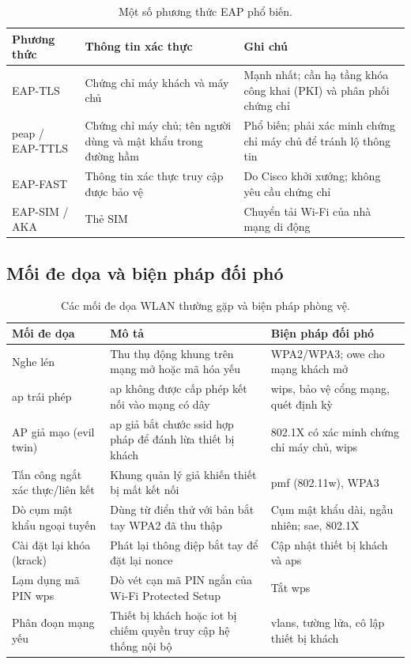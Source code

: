 \begin{table}[htbp]
  \centering\footnotesize
  \caption{Một số phương thức EAP phổ biến.}
  \label{tab:eap}
  \begin{tabularx}{\linewidth}{@{} L{0.6} L{1.2} L{1.2} @{}}
    \toprule
    \textbf{Phương thức} & \textbf{Thông tin xác thực} & \textbf{Ghi chú} \\
    \midrule
    EAP-TLS & Chứng chỉ máy khách và máy chủ & Mạnh nhất; cần hạ tầng khóa công khai (PKI) và phân phối chứng chỉ \\
    \acs{peap} / EAP-TTLS & Chứng chỉ máy chủ; tên người dùng và mật khẩu trong đường hầm & Phổ biến; phải xác minh chứng chỉ máy chủ để tránh lộ thông tin \\
    EAP-FAST & Thông tin xác thực truy cập được bảo vệ & Do Cisco khởi xướng; không yêu cầu chứng chỉ \\
    EAP-SIM / AKA & Thẻ SIM & Chuyển tải Wi-Fi của nhà mạng di động \\
    \bottomrule
  \end{tabularx}
\end{table}

\subsection{Mối đe dọa và biện pháp đối phó}

\begin{table}[!htbp]
  \centering\footnotesize
  \caption{Các mối đe dọa WLAN thường gặp và biện pháp phòng vệ.}
  \label{tab:threats}
  \begin{tabularx}{\linewidth}{@{} L{0.7} L{1.15} L{1.15} @{}}
    \toprule
    \textbf{Mối đe dọa} & \textbf{Mô tả} & \textbf{Biện pháp đối phó} \\
    \midrule
    Nghe lén & Thu thụ động khung trên mạng mở hoặc mã hóa yếu & WPA2/WPA3; \acs{owe} cho mạng khách mở \\
    \acs{ap} trái phép & \acs{ap} không được cấp phép kết nối vào mạng có dây & \acs{wips}, bảo vệ cổng mạng, quét định kỳ \\
    AP giả mạo (evil twin) & \acs{ap} giả bắt chước \acs{ssid} hợp pháp để đánh lừa thiết bị khách & 802.1X có xác minh chứng chỉ máy chủ, \acs{wips} \\
    Tấn công ngắt xác thực/liên kết & Khung quản lý giả khiến thiết bị mất kết nối & \acs{pmf} (802.11w), WPA3 \\
    Dò cụm mật khẩu ngoại tuyến & Dùng từ điển thử với bản bắt tay WPA2 đã thu thập & Cụm mật khẩu dài, ngẫu nhiên; \acs{sae}, 802.1X \\
    Cài đặt lại khóa (\acs{krack}) & Phát lại thông điệp bắt tay để đặt lại nonce \cite{krack2017} & Cập nhật thiết bị khách và \acp{ap} \\
    Lạm dụng mã PIN \acs{wps} & Dò vét cạn mã PIN ngắn của Wi-Fi Protected Setup & Tắt \acs{wps} \\
    Phân đoạn mạng yếu & Thiết bị khách hoặc \ac{iot} bị chiếm quyền truy cập hệ thống nội bộ & \acp{vlan}, tường lửa, cô lập thiết bị khách \\
    \bottomrule
  \end{tabularx}
\end{table}

